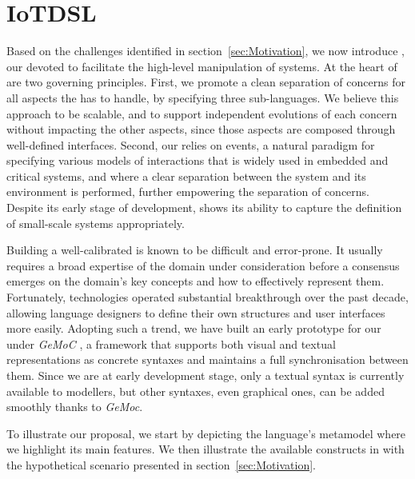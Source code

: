 \section{IoTDSL}
\label{sec:IoTDSL}

Based on the challenges identified in section~\ref{sec:Motivation}, we now introduce \IOTDSL, our \DSL devoted to facilitate the high-level manipulation of \IOT systems. At the heart of \IOTDSL are two governing principles. First, we promote a clean separation of concerns for all aspects the \DSL has to handle, by specifying three sub-languages. We believe this approach to be scalable, and to support independent evolutions of each concern without impacting the other aspects, since those aspects are composed through well-defined interfaces. Second, our \DSL relies on events, a natural paradigm for specifying various models of interactions that is widely used in embedded and critical systems, and where a clear separation between the system and its environment is performed, further empowering the separation of concerns. Despite its early stage of development, \IOTDSL shows its ability to capture the definition of small-scale \IOT systems appropriately.

Building a well-calibrated \DSL is known to be difficult and error-prone. It usually requires a broad expertise of the domain under consideration before a consensus emerges on the domain's key concepts and how to effectively represent them. Fortunately, \MDE technologies operated substantial breakthrough over the past decade, allowing language designers to define their own \DSL structures and user interfaces more easily. Adopting such a trend, we have built an early prototype for our \DSL under \textit{GeMoC} \cite{bousse-16}, a \MDE framework that supports both visual and textual representations as concrete syntaxes and maintains a full synchronisation between them. Since we are at early development stage, only a textual syntax is currently available to modellers, but other syntaxes, even graphical ones, can be added smoothly thanks to \textit{GeMoc}.

To illustrate our proposal, we start by depicting the language's metamodel where we highlight its main features. We then illustrate the available constructs in \IOTDSL with the hypothetical scenario presented in section~\ref{sec:Motivation}.






